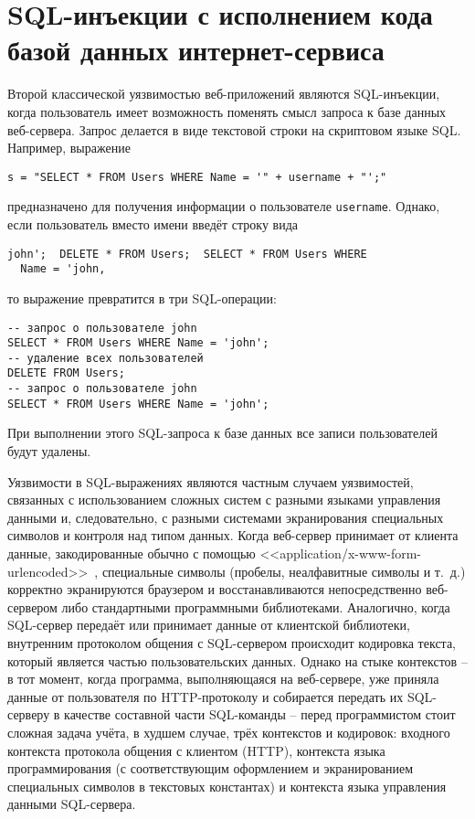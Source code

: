 \section[SQL-инъекции с исполнением кода веб-сервером]{SQL-инъекции с исполнением кода \protect\\ базой данных интернет-сервиса}

Второй классической уязвимостью веб-приложений являются SQL-инъекции, когда пользователь имеет возможность поменять смысл запроса к базе данных веб-сервера. Запрос делается в виде текстовой строки на скриптовом языке SQL. Например, выражение
\begin{verbatim}
s = "SELECT * FROM Users WHERE Name = '" + username + "';"
\end{verbatim}
предназначено для получения информации о пользователе \texttt{username}. Однако, если пользователь вместо имени введёт строку вида
\begin{center} \begin{verbatim}
john';  DELETE * FROM Users;  SELECT * FROM Users WHERE
  Name = 'john,
\end{verbatim} \end{center}
то выражение превратится в три SQL-операции:
\begin{verbatim}
-- запрос о пользователе john
SELECT * FROM Users WHERE Name = 'john';
-- удаление всех пользователей
DELETE FROM Users;
-- запрос о пользователе john
SELECT * FROM Users WHERE Name = 'john';
\end{verbatim}
При выполнении этого SQL-запроса к базе данных все записи пользователей будут удалены.

Уязвимости в SQL-выражениях являются частным случаем уязвимостей, связанных с использованием сложных систем с разными языками управления данными и, следовательно, с разными системами экранирования специальных символов и контроля над типом данных. Когда веб-сервер принимает от клиента данные, закодированные обычно с помощью <<application/x-www-form-urlencoded>>~\cite{html4:1999}, специальные символы (пробелы, неалфавитные символы и т.~д.) корректно экранируются браузером и восстанавливаются непосредственно веб-сервером либо стандартными программными библиотеками. Аналогично, когда SQL-сервер передаёт или принимает данные от клиентской библиотеки, внутренним протоколом общения с SQL-сервером происходит кодировка текста, который является частью пользовательских данных. Однако на стыке контекстов -- в тот момент, когда программа, выполняющаяся на веб-сервере, уже приняла данные от пользователя по HTTP-протоколу и собирается передать их SQL-серверу в качестве составной части SQL-команды -- перед программистом стоит сложная задача учёта, в худшем случае, трёх контекстов и кодировок: входного контекста протокола общения с клиентом (HTTP), контекста языка программирования (с соответствующим оформлением и экранированием специальных символов в текстовых константах) и контекста языка управления данными SQL-сервера.

